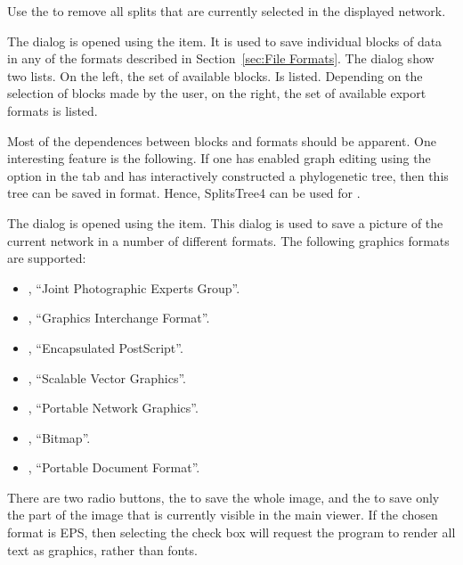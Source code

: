 \documentclass[11pt]{article}
\def\SplitsTree{{\sf SplitsTree4 }}
\begin{document}
Use the  to remove all splits that
are currently selected in the displayed network.




The  dialog is opened using the  item.
It is used to save individual blocks of data in any of the formats
described in Section~\ref{sec:File Formats}.
The dialog show two lists. On the left, the set of available
 blocks. Is listed. Depending on the selection of blocks made
by the user, on the right, the set of available export formats is listed.

Most of the dependences between blocks and formats should  be apparent.
One interesting feature is the following.
If one has enabled graph editing using the 
option
in the  tab and has interactively constructed
a phylogenetic tree, then this tree can be saved in  format.
Hence, \SplitsTree can be used for .


The  dialog is opened using the
 item.
This dialog is used to save a picture of the current network
in a number of different formats.
The following graphics formats are supported:

\begin{itemize}
\item {}, ``Joint Photographic Experts Group''.
\item {}, ``Graphics Interchange Format''.
\item {}, ``Encapsulated PostScript''.
\item {}, ``Scalable Vector Graphics''.
\item {}, ``Portable Network Graphics''.
\item {}, ``Bitmap''.
\item {}, ``Portable Document Format''.
\end{itemize}

There are two radio buttons, the 
to save the whole image, and the  to save
only the part of the image that is currently visible in the main viewer.
If the chosen format is EPS, then selecting
the  check box will request the program
to render all text as graphics, rather than fonts.
\end{document}
